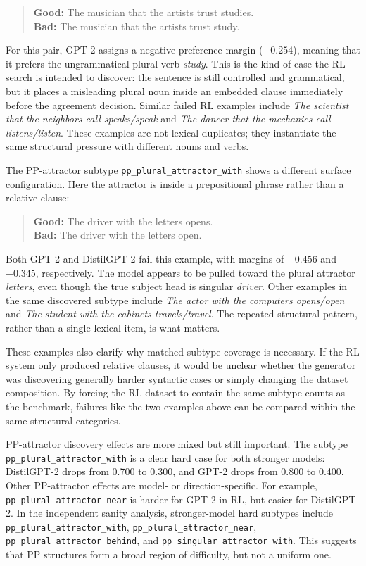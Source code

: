 \documentclass[11pt]{article}
\begin{document}
\begin{quote}
\small
\textbf{Good:} The musician that the artists trust studies.\\
\textbf{Bad:} The musician that the artists trust study.
\end{quote}

For this pair, GPT-2 assigns a negative preference margin ($-0.254$), meaning
that it prefers the ungrammatical plural verb \emph{study}. This is the kind
of case the RL search is intended to discover: the sentence is still
controlled and grammatical, but it places a misleading plural noun inside an
embedded clause immediately before the agreement decision. Similar failed RL
examples include \emph{The scientist that the neighbors call speaks/speak} and
\emph{The dancer that the mechanics call listens/listen}. These examples are
not lexical duplicates; they instantiate the same structural pressure with
different nouns and verbs.

The PP-attractor subtype \texttt{pp\_plural\_attractor\_with} shows a different
surface configuration. Here the attractor is inside a prepositional phrase
rather than a relative clause:

\begin{quote}
\small
\textbf{Good:} The driver with the letters opens.\\
\textbf{Bad:} The driver with the letters open.
\end{quote}

Both GPT-2 and DistilGPT-2 fail this example, with margins of $-0.456$ and
$-0.345$, respectively. The model appears to be pulled toward the plural
attractor \emph{letters}, even though the true subject head is singular
\emph{driver}. Other examples in the same discovered subtype include
\emph{The actor with the computers opens/open} and \emph{The student with the
cabinets travels/travel}. The repeated structural pattern, rather than a
single lexical item, is what matters.

These examples also clarify why matched subtype coverage is necessary. If the
RL system only produced relative clauses, it would be unclear whether the
generator was discovering generally harder syntactic cases or simply changing
the dataset composition. By forcing the RL dataset to contain the same subtype
counts as the benchmark, failures like the two examples above can be compared
within the same structural categories.

PP-attractor discovery effects are more mixed but still important. The subtype
\texttt{pp\_plural\_attractor\_with} is a clear hard case for both stronger
models: DistilGPT-2 drops from 0.700 to 0.300, and GPT-2 drops from 0.800 to
0.400. Other PP-attractor effects are model- or direction-specific. For
example, \texttt{pp\_plural\_attractor\_near} is harder for GPT-2 in RL, but
easier for DistilGPT-2. In the independent sanity analysis, stronger-model hard
subtypes include \texttt{pp\_plural\_attractor\_with},
\texttt{pp\_plural\_attractor\_near},
\texttt{pp\_plural\_attractor\_behind}, and
\texttt{pp\_singular\_attractor\_with}. This suggests that PP structures form
a broad region of difficulty, but not a uniform one.
\end{document}
